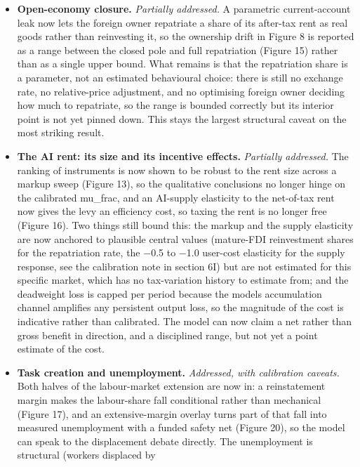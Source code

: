 \documentclass[11pt]{article}
\providecommand{\tightlist}{\setlength{\itemsep}{0pt}\setlength{\parskip}{0pt}}
\begin{document}
\begin{itemize}
\tightlist
\item
  \textbf{Open-economy closure.} \emph{Partially addressed.} A
  parametric current-account leak now lets the foreign owner repatriate
  a share of its after-tax rent as real goods rather than reinvesting
  it, so the ownership drift in Figure 8 is reported as a range between
  the closed pole and full repatriation (Figure 15) rather than as a
  single upper bound. What remains is that the repatriation share is a
  parameter, not an estimated behavioural choice: there is still no
  exchange rate, no relative-price adjustment, and no optimising foreign
  owner deciding how much to repatriate, so the range is bounded
  correctly but its interior point is not yet pinned down. This stays
  the largest structural caveat on the most striking result.
\item
  \textbf{The AI rent: its size and its incentive effects.}
  \emph{Partially addressed.} The ranking of instruments is now shown to
  be robust to the rent size across a markup sweep (Figure 13), so the
  qualitative conclusions no longer hinge on the calibrated mu\_frac,
  and an AI-supply elasticity to the net-of-tax rent now gives the levy
  an efficiency cost, so taxing the rent is no longer free (Figure 16).
  Two things still bound this: the markup and the supply elasticity are
  now anchored to plausible central values (mature-FDI reinvestment
  shares for the repatriation rate, the $-$0.5 to $-$1.0 user-cost
  elasticity for the supply response, see the calibration note in
  section 6I) but are not estimated for this specific market, which has
  no tax-variation history to estimate from; and the deadweight loss is
  capped per period because the model\textquotesingle s accumulation
  channel amplifies any persistent output loss, so the magnitude of the
  cost is indicative rather than calibrated. The model can now claim a
  net rather than gross benefit in direction, and a disciplined range,
  but not yet a point estimate of the cost.
\item
  \textbf{Task creation and unemployment.} \emph{Addressed, with
  calibration caveats.} Both halves of the labour-market extension are
  now in: a reinstatement margin makes the labour-share fall conditional
  rather than mechanical (Figure 17), and an extensive-margin overlay
  turns part of that fall into measured unemployment with a funded
  safety net (Figure 20), so the model can speak to the displacement
  debate directly. The unemployment is structural (workers displaced by

\end{itemize}
\end{document}
